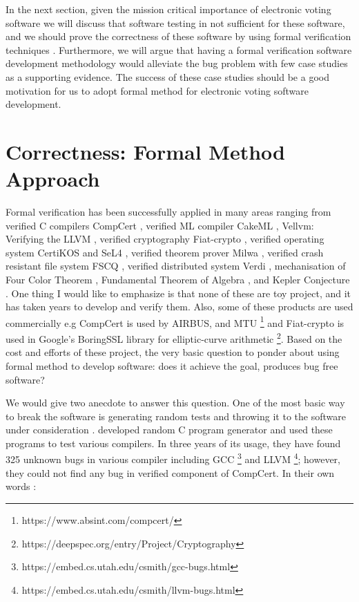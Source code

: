    In the next section, given the mission critical importance of electronic voting software 
   we will discuss that software testing 
   in not sufficient for these software,  and we should 
   prove the  correctness of these software
   by using formal verification techniques \citep{BECKERT2014115}.
   Furthermore, we will argue that  having a formal verification software development methodology would alleviate 
	the bug problem with few case studies as a supporting evidence. The success of these 
	case studies should be a good motivation for us to 
	adopt formal method for electronic voting software development. 
   
   
   \section{Correctness: Formal Method Approach}
   \label{secback:correctness_formal}

	Formal verification has been successfully applied in many areas ranging 
	from verified C compilers CompCert \citep{DBLP:conf/popl/Leroy06}, verified ML compiler
	CakeML \citep{Kumar:2014:CVI}, Vellvm: Verifying the LLVM 
	\citep{10.1007/978-3-642-35308-6_6}, verified cryptography 
	Fiat-crypto \citep{DBLP:conf/sp/ErbsenPGSC19}, verified 
	operating system CertiKOS \citep{DBLP:conf/apsys/GuVFSC11} and 
	SeL4 \citep{DBLP:conf/sosp/KleinEHACDEEKNSTW09}, verified theorem 
	prover Milwa \citep{DBLP:conf/itp/MyreenD14}, 
	verified crash resistant file system FSCQ \citep{Chen:2015:UCH:2815400.2815402}, 
	verified distributed system 
	Verdi \citep{DBLP:conf/pldi/WilcoxWPTWEA15}, mechanisation of 
	Four Color Theorem \citep{10.1007/978-3-540-87827-8_28}, 
	Fundamental Theorem of 
	Algebra \citep{10.1007/3-540-45842-5_7}, and Kepler Conjecture \citep{hales-kepler}.
	One thing I would like to emphasize 
	is that none of these are toy project, and it has taken years 
	to develop and verify them. Also, some of these products 
	are used commercially e.g CompCert is used by AIRBUS, and MTU
	\footnote{https://www.absint.com/compcert/} and Fiat-crypto is used 
	in Google's BoringSSL library for elliptic-curve arithmetic 
	\footnote{https://deepspec.org/entry/Project/Cryptography}. 
	Based on the cost and efforts of these project, 
	the very basic question to ponder about using formal method to develop 
	software:  does it achieve the goal, produces bug free software?
	
	
	We would give two anecdote to answer this question. 
	One of the most basic way to 
	break the software is generating random tests and throwing it to 
	the software under consideration \citep{Miller:1990:ESR:96267.96279}.
	\citep{Yang:2011:FUB:1993316.1993532} developed random 
	C program generator and used these programs to test various 
	compilers. In three years of its usage, they have found 325 unknown
	bugs in various compiler including GCC
	\footnote{https://embed.cs.utah.edu/csmith/gcc-bugs.html} and LLVM
	\footnote{https://embed.cs.utah.edu/csmith/llvm-bugs.html}; however, 
	they could not find any bug in verified component of CompCert. 
	In their own words \citep{Yang:2011:FUB:1993316.1993532}:
	
